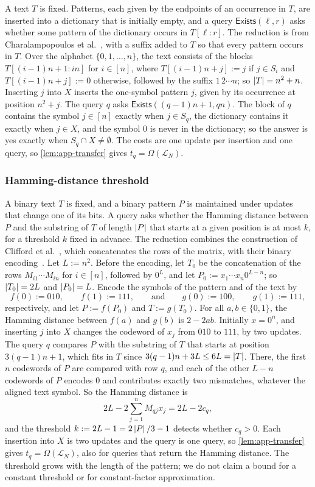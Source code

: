 A text $T$ is fixed. Patterns, each given by the endpoints of an occurrence in $T$, are inserted into a dictionary that is initially empty, and a query $\mathsf{Exists}(\ell,r)$ asks whether some pattern of the dictionary occurs in $T[\ell:r]$. The reduction is from Charalampopoulos et al.~\cite[Theorem~24]{charalampopoulos_internal_2019}, with a suffix added to $T$ so that every pattern occurs in $T$. Over the alphabet $\{0,1,\dots,n\}$, the text consists of the blocks $T[(i-1)n+1:in]$ for $i\in[n]$, where $T[(i-1)n+j]:=j$ if $j\in S_i$ and $T[(i-1)n+j]:=0$ otherwise, followed by the suffix $1\,2\cdots n$; so $\left|T\right|=n^2+n$. Inserting $j$ into $X$ inserts the one-symbol pattern $j$, given by its occurrence at position $n^2+j$. The query $q$ asks $\mathsf{Exists}((q-1)n+1,qn)$. The block of $q$ contains the symbol $j\in[n]$ exactly when $j\in S_q$, the dictionary contains it exactly when $j\in X$, and the symbol $0$ is never in the dictionary; so the answer is yes exactly when $S_q\cap X\ne\emptyset$. The costs are one update per insertion and one query, so \cref{lem:app-transfer} gives $t_q=\Omega(\mathcal L_N)$.

\subsubsection{Hamming-distance threshold}\label{sec:hamming-threshold}

A binary text $T$ is fixed, and a binary pattern $P$ is maintained under updates that change one of its bits. A query asks whether the Hamming distance between $P$ and the substring of $T$ of length $\left|P\right|$ that starts at a given position is at most $k$, for a threshold $k$ fixed in advance. The reduction combines the construction of Clifford et al.~\cite[Theorem~15]{clifford_upper_2018}, which concatenates the rows of the matrix, with their binary encoding~\cite[Lemma~11]{clifford_upper_2018}. Let $L:=n^2$. Before the encoding, let $T_0$ be the concatenation of the rows $M_{i1}\cdots M_{in}$ for $i\in[n]$, followed by $0^L$, and let $P_0:=x_1\cdots x_n0^{L-n}$; so $\left|T_0\right|=2L$ and $\left|P_0\right|=L$. Encode the symbols of the pattern and of the text by
\[
f(0):=010,\qquad f(1):=111,
\qquad\text{and}\qquad
g(0):=100,\qquad g(1):=111,
\]
respectively, and let $P:=f(P_0)$ and $T:=g(T_0)$. For all $a,b\in\{0,1\}$, the Hamming distance between $f(a)$ and $g(b)$ is $2-2ab$. Initially $x=0^n$, and inserting $j$ into $X$ changes the codeword of $x_j$ from $010$ to $111$, by two updates. The query $q$ compares $P$ with the substring of $T$ that starts at position $3(q-1)n+1$, which fits in $T$ since $3(q-1)n+3L\le6L=\left|T\right|$. There, the first $n$ codewords of $P$ are compared with row $q$, and each of the other $L-n$ codewords of $P$ encodes $0$ and contributes exactly two mismatches, whatever the aligned text symbol. So the Hamming distance is
\[
2L-2\sum_{j=1}^nM_{qj}x_j=2L-2c_q,
\]
and the threshold $k:=2L-1=2\left|P\right|/3-1$ detects whether $c_q>0$. Each insertion into $X$ is two updates and the query is one query, so \cref{lem:app-transfer} gives $t_q=\Omega(\mathcal L_N)$, also for queries that return the Hamming distance. The threshold grows with the length of the pattern; we do not claim a bound for a constant threshold or for constant-factor approximation.

